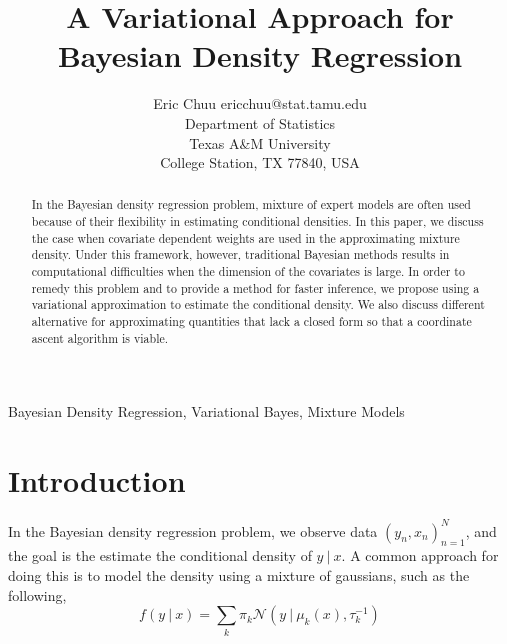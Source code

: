 \documentclass[twoside,11pt]{article}
\newcommand\given[1][]{\:#1\vert\:}
\begin{document}
\title{A Variational Approach for Bayesian Density Regression}

\author{\name Eric Chuu \email ericchuu@stat.tamu.edu \\
       \addr Department of Statistics\\
       Texas A\&M University \\
       College Station, TX 77840, USA}

\maketitle

\begin{abstract}%
In the Bayesian density regression problem, mixture of expert models are often used because of their flexibility in estimating conditional densities. In this paper, we discuss the case when covariate dependent weights are used in the approximating mixture density. Under this framework, however, traditional Bayesian methods results in computational difficulties when the dimension of the covariates is large. In order to remedy this problem and to provide a method for faster inference, we propose using a variational approximation to estimate the conditional density. We also discuss different alternative for approximating quantities that lack a closed form so that a coordinate ascent algorithm is viable.
\end{abstract}

\begin{keywords}
  Bayesian Density Regression, Variational Bayes, Mixture Models
\end{keywords}

\section{Introduction}

In the Bayesian density regression problem, we observe data $\left(y_n, x_n \right)_{n=1}^N$, and the goal is the estimate the conditional density of $y \given x$. A common approach for doing this is to model the density using a mixture of gaussians, such as the following,
\begin{equation} \label{eq:general_gm}
	f(y \given x) = \sum_{k} \pi_k \mathcal{N} \left(y \given \mu_k(x), \tau_k^{-1} \right)
\end{equation}
\end{document}
